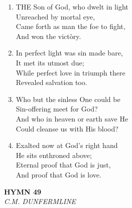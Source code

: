 \documentclass[11pt,a4paper]{article}
\begin{document}
\begin{enumerate}
    \item THE Son of God, who dwelt in light \\
        Unreached by mortal eye, \\
        Came forth as man the foe to fight, \\
        And won the vict\`ory.

    \item In perfect light was sin made bare, \\
        It met its utmost due; \\
        While perfect love in triumph there \\
        Revealed salvation too.

    \item Who but the sinless One could be \\
        Sin-offering meet for God? \\
        And who in heaven or earth save He \\
        Could cleanse us with His blood?

    \item Exalted now at God's right hand \\
        He sits enthroned above; \\
        Eternal proof that God is just, \\
        And proof that God is love.

\end{enumerate}

\newpage
\begin{center}
    {\Large \textbf{HYMN 49}}
    \\
    \textit{C.M. DUNFERMLINE}
\end{center}
\vspace{1em}
\end{document}
